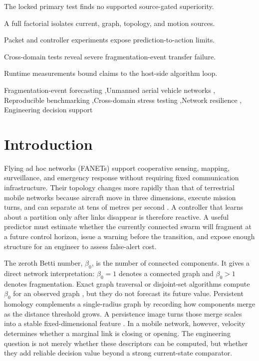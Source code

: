 \documentclass[final,5p,times,twocolumn]{elsarticle}
\begin{document}
\begin{frontmatter}
\begin{highlights}
\item The locked primary test finds no supported source-gated superiority.
\item A full factorial isolates current, graph, topology, and motion sources.
\item Packet and controller experiments expose prediction-to-action limits.
\item Cross-domain tests reveal severe fragmentation-event transfer failure.
\item Runtime measurements bound claims to the host-side algorithm loop.
\end{highlights}

\begin{keyword}
Fragmentation-event forecasting \sep Unmanned aerial vehicle networks \sep
Reproducible benchmarking \sep Cross-domain stress testing \sep Network resilience \sep
Engineering decision support
\end{keyword}

\end{frontmatter}

\section{Introduction}

Flying ad hoc networks (FANETs) support cooperative sensing, mapping, surveillance, and
emergency response without requiring fixed communication infrastructure. Their topology
changes more rapidly than that of terrestrial mobile networks because aircraft move in
three dimensions, execute mission turns, and can separate at tens of metres per second
\cite{BEKMEZCI20131254,pasandideh2023review}. A controller that learns about a partition
only after links disappear is therefore reactive. A useful predictor must estimate
whether the currently connected swarm will fragment at a future control horizon, issue a
warning before the transition, and expose enough structure for an engineer to assess
false-alert cost.

The zeroth Betti number, $\beta_0$, is the number of connected components. It gives a
direct network interpretation: $\beta_0=1$ denotes a connected graph and $\beta_0>1$
denotes fragmentation. Exact graph traversal or disjoint-set algorithms compute
$\beta_0$ for an observed graph \cite{tarjan1975efficiency,cormen2009introduction}, but
they do not forecast its future value. Persistent homology complements a single-radius
graph by recording how components merge as the distance threshold grows. A persistence
image turns those merge scales into a stable fixed-dimensional feature
\cite{adams2017persistence}. In a mobile network, however, velocity determines whether a
marginal link is closing or opening. The engineering question is not merely whether these
descriptors can be computed, but whether they add reliable decision value beyond a strong
current-state comparator.
\end{document}
